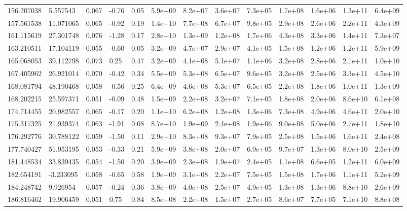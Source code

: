 \documentclass[referee]{aa}
\begin{document}
{\begin{landscape}
\begin{longtable}{lllllllllllll}
156.207038 & 5.557543 & 0.067 & -0.76 & 0.05 & 5.9e+09 & 8.2e+07 & 3.6e+07 & 7.3e+05 & 1.7e+08 & 1.6e+06 & 1.3e+11 & 6.4e+09 \\
157.561538 & 11.071065 & 0.065 & -0.92 & 0.19 & 1.4e+10 & 7.7e+08 & 6.7e+07 & 9.8e+05 & 2.9e+08 & 2.6e+06 & 2.2e+11 & 4.3e+09 \\
161.115619 & 27.301748 & 0.076 & -1.28 & 0.17 & 2.8e+10 & 1.3e+09 & 1.2e+08 & 1.7e+06 & 4.3e+08 & 3.3e+06 & 1.4e+11 & 7.3e+07 \\
163.210511 & 17.104119 & 0.055 & -0.60 & 0.05 & 3.2e+09 & 4.7e+07 & 2.9e+07 & 4.1e+05 & 1.5e+08 & 1.2e+06 & 1.2e+11 & 5.9e+09 \\
165.068053 & 39.112798 & 0.073 & 0.25 & 0.47 & 3.2e+09 & 4.1e+08 & 5.1e+07 & 1.1e+06 & 3.2e+08 & 2.8e+06 & 2.1e+11 & 1.0e+10 \\
167.405962 & 26.921014 & 0.070 & -0.42 & 0.34 & 5.5e+09 & 5.3e+08 & 6.5e+07 & 9.6e+05 & 3.2e+08 & 2.5e+06 & 3.3e+11 & 4.5e+10 \\
168.081794 & 48.190468 & 0.058 & -0.56 & 0.25 & 6.4e+09 & 4.6e+08 & 5.3e+07 & 6.5e+05 & 2.2e+08 & 1.8e+06 & 1.0e+11 & 1.3e+09 \\
168.202215 & 25.597371 & 0.051 & -0.09 & 0.48 & 1.5e+09 & 2.2e+08 & 3.2e+07 & 7.1e+05 & 1.8e+08 & 2.0e+06 & 8.6e+10 & 6.1e+08 \\
174.714455 & 20.982557 & 0.065 & -0.17 & 0.20 & 1.1e+10 & 6.2e+08 & 1.2e+08 & 1.3e+06 & 7.3e+08 & 4.9e+06 & 4.6e+11 & 2.0e+10 \\
175.317325 & 21.939374 & 0.063 & -1.91 & 0.08 & 8.7e+10 & 1.9e+09 & 2.4e+08 & 1.9e+06 & 9.0e+08 & 5.0e+06 & 2.7e+11 & 1.8e+10 \\
176.292776 & 30.788122 & 0.059 & -1.50 & 0.11 & 2.9e+10 & 8.3e+08 & 9.3e+07 & 7.9e+05 & 2.5e+08 & 1.5e+06 & 1.6e+11 & 2.4e+08 \\
177.740427 & 51.953195 & 0.053 & -0.33 & 0.21 & 5.9e+09 & 3.8e+08 & 2.0e+07 & 6.9e+05 & 9.7e+07 & 1.3e+06 & 8.0e+10 & 2.5e+09 \\
181.448534 & 33.839435 & 0.054 & -1.50 & 0.20 & 3.9e+09 & 2.3e+08 & 1.9e+07 & 2.4e+05 & 1.1e+08 & 6.6e+05 & 1.2e+11 & 6.0e+09 \\
182.654191 & -3.233095 & 0.058 & -0.65 & 0.58 & 1.9e+09 & 3.1e+08 & 2.2e+07 & 7.5e+05 & 1.5e+08 & 1.7e+06 & 1.1e+11 & 5.2e+09 \\
184.248742 & 9.926954 & 0.057 & -0.24 & 0.36 & 3.8e+09 & 4.0e+08 & 2.5e+07 & 4.9e+05 & 1.3e+08 & 1.3e+06 & 8.8e+10 & 2.6e+09 \\
186.816462 & 19.906459 & 0.051 & 0.75 & 0.84 & 8.5e+08 & 2.2e+08 & 1.5e+07 & 2.7e+05 & 8.6e+07 & 7.7e+05 & 7.1e+10 & 8.8e+08 \\

\end{longtable}
\end{landscape}}
\end{document}
